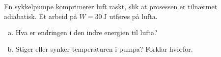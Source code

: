 %
En sykkelpumpe komprimerer luft raskt, slik at prosessen er tilnærmet adiabatisk. Et arbeid på $W = \SI{30}{\joule}$ utføres på lufta.
\begin{enumerate}[a)]
    \item Hva er endringen i den indre energien til lufta?
    \item Stiger eller synker temperaturen i pumpa? Forklar hvorfor.
\end{enumerate}
%
